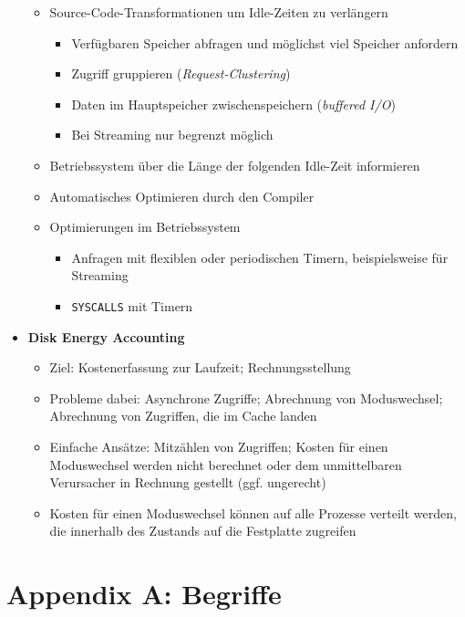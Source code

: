 \begin{itemize}
	\begin{itemize}
		\item Source-Code-Transformationen um Idle-Zeiten zu verlängern
		\begin{itemize}
			\item Verfügbaren Speicher abfragen und möglichst viel Speicher anfordern
			\item Zugriff gruppieren (\textit{Request-Clustering})
			\item Daten im Hauptspeicher zwischenspeichern (\textit{buffered I/O})
			\item Bei Streaming nur begrenzt möglich
		\end{itemize}
		\item Betriebssystem über die Länge der folgenden Idle-Zeit informieren
		\item Automatisches Optimieren durch den Compiler
		\item Optimierungen im Betriebssystem
		\begin{itemize}
			\item Anfragen mit flexiblen oder periodischen Timern, beispielsweise für Streaming
			\item \texttt{SYSCALLS} mit Timern
		\end{itemize}
	\end{itemize}
	\item \textbf{Disk Energy Accounting}
	\begin{itemize}
		\item Ziel: Kostenerfassung zur Laufzeit; Rechnungsstellung
		\item Probleme dabei: Asynchrone Zugriffe; Abrechnung von Moduswechsel; Abrechnung von Zugriffen, die im Cache landen
		\item Einfache Ansätze: Mitzählen von Zugriffen; Kosten für einen Moduswechsel werden nicht berechnet oder dem unmittelbaren Verursacher in Rechnung gestellt (ggf. ungerecht)
		\item Kosten für einen Moduswechsel können auf alle Prozesse verteilt werden, die innerhalb des Zustands auf die Festplatte zugreifen
	\end{itemize}
\end{itemize}



\section{Appendix A: Begriffe}

